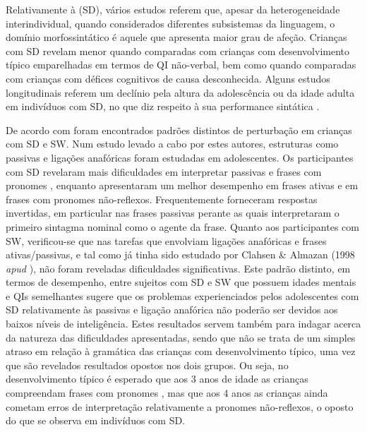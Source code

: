 \documentclass[output=paper]{LSP/langsci}
\begin{document}
Relativamente à  (SD), vários estudos referem que, apesar da heterogeneidade interindividual, quando considerados diferentes subsistemas da linguagem, o domínio morfossintático é aquele que apresenta maior grau de afeção. Crianças com SD revelam menor  quando comparadas com crianças com desenvolvimento típico emparelhadas em termos de QI não-verbal, bem como quando comparadas com crianças com défices cognitivos de causa desconhecida. Alguns estudos longitudinais referem um declínio pela altura da adolescência ou da idade adulta em indivíduos com SD, no que diz respeito à sua performance sintática \citep{roberts_etal2007}. 

De acordo com \cite{ringclahsen2005} foram encontrados padrões distintos de perturbação em crianças com SD e SW. Num estudo levado a cabo por estes autores, estruturas como passivas e ligações anafóricas foram estudadas em adolescentes. Os participantes com SD revelaram mais dificuldades em interpretar passivas e frases com pronomes , enquanto apresentaram um melhor desempenho em frases ativas e em frases com pronomes não-reflexos. Frequentemente forneceram respostas invertidas, em particular nas frases passivas perante as quais interpretaram o primeiro sintagma nominal como o agente da frase. Quanto aos participantes com SW, verificou-se que nas tarefas que envolviam ligações anafóricas e frases ativas/passivas, e tal como já tinha sido estudado por Clahsen \& Almazan (1998 \textit{apud} \citealt{guasti2002}), não foram reveladas dificuldades significativas. Este padrão distinto, em termos de desempenho, entre sujeitos com SD e SW que possuem idades mentais e QIs semelhantes sugere que os problemas experienciados pelos adolescentes com SD relativamente às passivas e ligação anafórica não poderão ser devidos aos baixos níveis de inteligência. Estes resultados servem também para indagar acerca da natureza das dificuldades apresentadas, sendo que não se trata de um simples atraso em relação à gramática das crianças com desenvolvimento típico, uma vez que são revelados resultados opostos nos dois grupos. Ou seja, no desenvolvimento típico é esperado que aos 3 anos de idade as crianças compreendam frases com pronomes , mas que aos 4 anos as crianças ainda cometam erros de interpretação relativamente a pronomes não-reflexos, o oposto do que se observa em indivíduos com SD.
\end{document}
